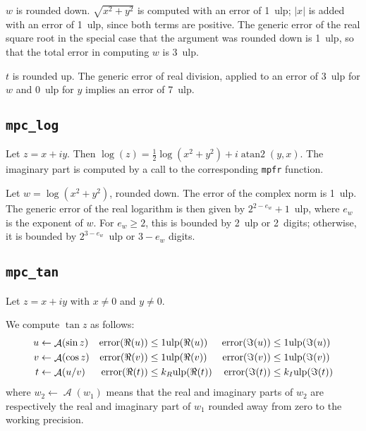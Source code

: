 \documentclass {article}
\newcommand {\mpfr}{{\tt mpfr}}
\newcommand {\ulp}[1]{#1~ulp}
\newcommand {\atantwo}{\operatorname {atan2}}
\newcommand {\Ulp}{{\rm ulp}}
\DeclareMathOperator{\error}{error}
\DeclareMathOperator{\A}{\mathcal A}
\begin{document}
$w$ is rounded down. $\sqrt {x^2 + y^2}$ is computed with an error of \ulp{1}; $|x|$ is added with an error of \ulp{1}, since both terms are positive. The generic error of the real square root in the special case that the argument was rounded down is \ulp{1}, so that the total error in computing $w$ is \ulp{3}.

$t$ is rounded up. The generic error of real division, applied to an error of \ulp{3} for $w$ and \ulp{0} for $y$ implies an error of \ulp{7}.


\subsection {\texttt {mpc\_log}}

Let $z = x + i y$. Then $\log (z) = \frac {1}{2} \log (x^2 + y^2) + i \atantwo (y, x)$. The imaginary part is computed by a call to the corresponding {\mpfr} function.

Let $w = \log (x^2 + y^2)$, rounded down. The error of the complex norm is \ulp{1}. The generic error of the real logarithm is then given by \ulp{$2^{2 - e_w} + 1$}, where $e_w$ is the exponent of $w$. For $e_w \geq 2$, this is bounded by \ulp{2} or 2~digits; otherwise, it is bounded by \ulp{$2^{3 - e_w}$} or $3 - e_w$ digits.

\subsection {\texttt {mpc\_tan}}

Let $z = x + i y$ with $x \neq 0$ and $y \neq 0$.

We compute $\tan z$ as follows:
\begin{align*}
u &\leftarrow \A(\sin z) &\error(\Re(u)) &\leq 1 \Ulp(\Re(u))
&\error(\Im(u)) &\leq 1 \Ulp(\Im(u))
\\
v &\leftarrow \A(\cos z) &\error(\Re(v)) &\leq 1 \Ulp(\Re(v))
&\error(\Im(v)) &\leq 1 \Ulp(\Im(v))
\\
t &\leftarrow \A(u/v) &\error(\Re(t)) &\leq k_R \Ulp(\Re(t))
&\error(\Im(t)) &\leq k_I \Ulp(\Im(t))
\end{align*}
where $w_2 \leftarrow \A(w_1)$ means that the real and imaginary parts of
$w_2$ are respectively the real and imaginary part of $w_1$ rounded away from
zero to the working precision.
\end{document}
